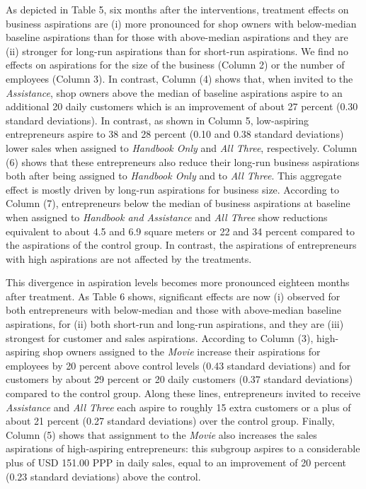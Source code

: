 \documentclass[11.5pt]{article}
\begin{document}
As depicted in Table 5, six months after the interventions, treatment effects on business aspirations are (i) more pronounced for shop owners with below-median baseline aspirations than for those with above-median aspirations and they are (ii) stronger for long-run aspirations than for short-run aspirations. We find no effects on aspirations for the size of the business (Column 2) or the number of employees (Column 3). In contrast, Column (4) shows that, when invited to the \emph{Assistance}, shop owners above the median of baseline aspirations aspire to an additional 20 daily customers which is an improvement of about 27 percent (0.30 standard deviations). In contrast, as shown in Column 5, low-aspiring entrepreneurs aspire to 38 and 28 percent (0.10 and 0.38 standard deviations) lower sales when assigned to \emph{Handbook Only} and \emph{All Three}, respectively. Column (6) shows that these entrepreneurs also reduce their long-run business aspirations both after being assigned to \emph{Handbook Only} and to \emph{All Three}. This aggregate effect is mostly driven by long-run aspirations for business size. According to Column (7), entrepreneurs below the median of business aspirations at baseline when assigned to \emph{Handbook and Assistance} and \emph{All Three} show reductions equivalent to about 4.5 and 6.9 square meters or 22 and 34 percent compared to the aspirations of the control group. In contrast, the aspirations of entrepreneurs with high aspirations are not affected by the treatments.

This divergence in aspiration levels becomes more pronounced eighteen months after treatment. As Table 6 shows, significant effects are now (i) observed for both entrepreneurs with below-median and those with above-median baseline aspirations, for (ii) both short-run and long-run aspirations, and they are (iii) strongest for customer and sales aspirations. According to Column (3), high-aspiring shop owners assigned to the \emph{Movie} increase their aspirations for employees by 20 percent above control levels (0.43 standard deviations) and for customers by about 29 percent or 20 daily customers (0.37 standard deviations) compared to the control group. Along these lines, entrepreneurs invited to receive \emph{Assistance} and \emph{All Three} each aspire to roughly 15 extra customers or a plus of about 21 percent (0.27 standard deviations) over the control group. Finally, Column (5) shows that assignment to the \emph{Movie} also increases the sales aspirations of high-aspiring entrepreneurs: this subgroup aspires to a considerable plus of USD 151.00 PPP in daily sales, equal to an improvement of 20 percent (0.23 standard deviations) above the control.
\end{document}

